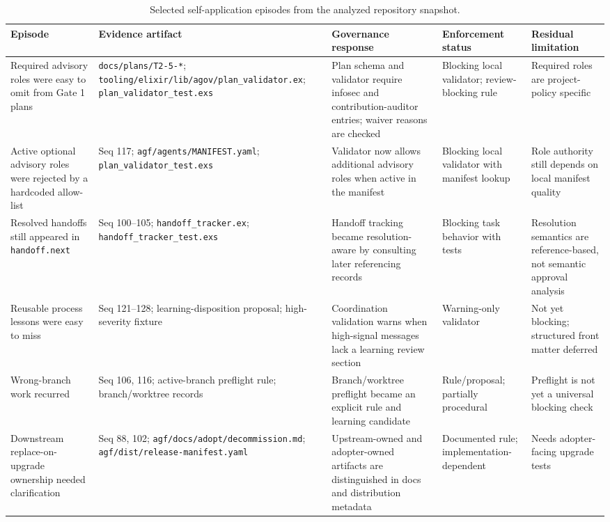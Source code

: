 \documentclass[conference]{IEEEtran}
\begin{document}
\begin{table}[t]
\caption{Selected self-application episodes from the analyzed repository snapshot.}
\label{tab:episodes}
\centering
\scriptsize
\begin{tabular}{@{}p{}p{}p{}p{}p{}@{}}
\hline
Episode & Evidence artifact & Governance response & Enforcement status & Residual limitation \\
\hline
Required advisory roles were easy to omit from Gate 1 plans & \texttt{docs/plans/T2-5-*}; \texttt{tooling/elixir/lib/agov/plan\_validator.ex}; \texttt{plan\_validator\_test.exs} & Plan schema and validator require infosec and contribution-auditor entries; waiver reasons are checked & Blocking local validator; review-blocking rule & Required roles are project-policy specific \\
Active optional advisory roles were rejected by a hardcoded allow-list & Seq 117; \texttt{agf/agents/MANIFEST.yaml}; \texttt{plan\_validator\_test.exs} & Validator now allows additional advisory roles when active in the manifest & Blocking local validator with manifest lookup & Role authority still depends on local manifest quality \\
Resolved handoffs still appeared in \texttt{handoff.next} & Seq 100--105; \texttt{handoff\_tracker.ex}; \texttt{handoff\_tracker\_test.exs} & Handoff tracking became resolution-aware by consulting later referencing records & Blocking task behavior with tests & Resolution semantics are reference-based, not semantic approval analysis \\
Reusable process lessons were easy to miss & Seq 121--128; learning-disposition proposal; high-severity fixture & Coordination validation warns when high-signal messages lack a learning review section & Warning-only validator & Not yet blocking; structured front matter deferred \\
Wrong-branch work recurred & Seq 106, 116; active-branch preflight rule; branch/worktree records & Branch/worktree preflight became an explicit rule and learning candidate & Rule/proposal; partially procedural & Preflight is not yet a universal blocking check \\
Downstream replace-on-upgrade ownership needed clarification & Seq 88, 102; \texttt{agf/docs/adopt/decommission.md}; \texttt{agf/dist/release-manifest.yaml} & Upstream-owned and adopter-owned artifacts are distinguished in docs and distribution metadata & Documented rule; implementation-dependent & Needs adopter-facing upgrade tests \\
\hline
\end{tabular}
\end{table}
\end{document}
